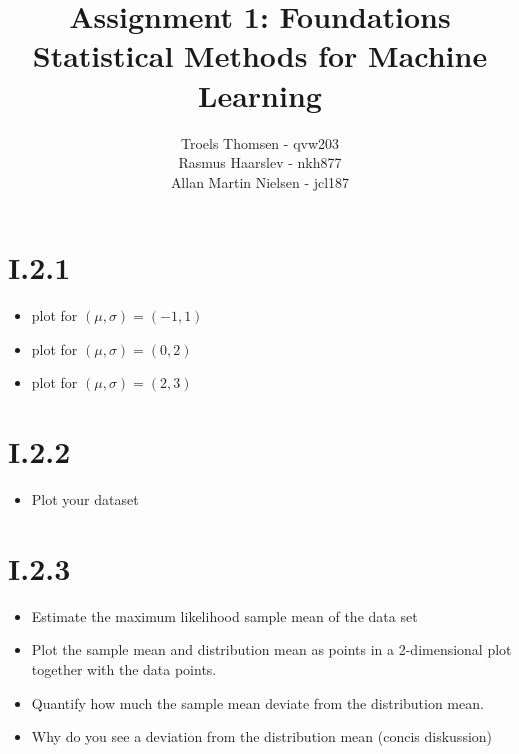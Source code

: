 \documentclass[12pt, a4paper]{article}
\title{Assignment 1: Foundations\\Statistical Methods for Machine Learning}
\author{Troels Thomsen - qvw203\\Rasmus Haarslev - nkh877\\Allan Martin Nielsen - jcl187}
\begin{document}
\pagestyle{empty}
\maketitle
\newpage

\pagestyle{fancy}

\section{I.2.1}
\begin{itemize}
\item plot for $(\mu, \sigma) = (-1, 1)$
\item plot for $(\mu, \sigma) = (0, 2)$
\item plot for $(\mu, \sigma) = (2, 3)$
\end{itemize}

\section{I.2.2}
\begin{itemize}
\item Plot your dataset
\end{itemize}

\section{I.2.3}
\begin{itemize}
\item Estimate the maximum likelihood sample mean of the data set
\item Plot the sample mean and distribution mean as points in a 2-dimensional plot
together with the data points.
\item Quantify how much the sample mean deviate from
the distribution mean.
\item Why do you see a deviation from the distribution mean (concis diskussion)
\end{itemize}
\end{document}
